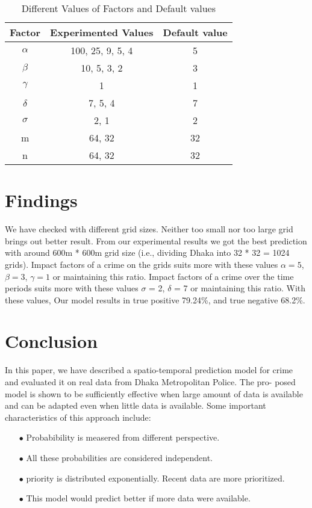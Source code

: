 \documentclass{sig-alternate}
\begin{document}
   
   \begin{table}[h]
      \caption{ Different Values of Factors and Default values}
      \label{factors}
      \begin{center}
      \begin{tabular}{|c|c|c|}\hline
      Factor & Experimented Values & Default value\\ \hline
      $\alpha$ & 100, 25, 9, 5, 4 & 5\\ \hline
      $\beta$ & 10, 5, 3, 2 & 3\\ \hline
      $\gamma$ & 1 & 1\\ \hline
      $\delta$ &  7, 5, 4 & 7\\ \hline
      $\sigma$ &  2, 1 & 2\\ \hline
      m & 64, 32 & 32\\ \hline
      n & 64, 32 & 32\\ \hline
      \end{tabular}
      \end{center}
      \end{table}
   

\section{Findings}
We have checked with different grid sizes. Neither too small nor too large grid brings out better result. From our experimental results we got the best prediction with around 600m * 600m grid size (i.e., dividing Dhaka into 32 * 32 = 1024 grids). Impact factors of a crime on the grids suits more with these values $\alpha=5$, $\beta=3$, $\gamma=1$ or maintaining this ratio. Impact factors of a crime over the time periods suits more with these values $\sigma$ = 2, $\delta$ = 7 or maintaining this ratio. With these values, Our model results in true positive 79.24\%, and true negative 68.2\%.


\section{Conclusion}
In this paper, we have described a  spatio-temporal prediction model for crime
 and evaluated it on real  data from Dhaka Metropolitan Police. The pro-
posed model is shown to be sufficiently effective when large amount of data is available and can be adapted even when little data is available. Some important
characteristics of this approach include:
\begin{enumerate}
	\item[$\bullet$] {\sf Probabibility is measered from different perspective.}
	\item[$\bullet$] {\sf  All these probabilities are considered independent.}
	\item[$\bullet$] {\sf priority is distributed exponentially. Recent data are more prioritized.}
	\item[$\bullet$] {\sf This model would predict better if more data were available.}
\end{enumerate}
\end{document}
